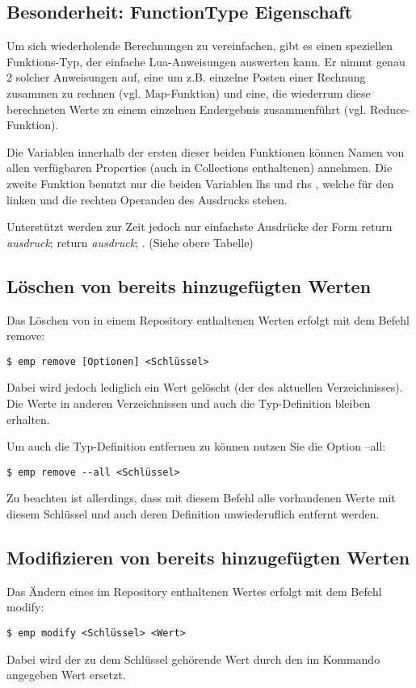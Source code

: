 \subsection{Besonderheit: FunctionType Eigenschaft}
Um sich wiederholende Berechnungen zu vereinfachen, gibt es einen speziellen Funktions-Typ, der einfache Lua-Anweisungen auswerten kann. Er nimmt genau 2 solcher Anweisungen auf, eine um z.B. einzelne Posten einer Rechnung zusammen zu rechnen (vgl. \grqq Map-Funktion\grqq) und eine, die wiederrum diese berechneten Werte zu einem einzelnen Endergebnis zusammenführt (vgl. \grqq Reduce-Funktion\grqq).

Die Variablen innerhalb der ersten dieser beiden Funktionen können Namen von allen verfügbaren Properties (auch in Collections enthaltenen) annehmen. Die zweite Funktion benutzt nur die beiden Variablen \grqq lhs \grqq und \grqq rhs \grqq , welche für den linken und die rechten Operanden des Ausdrucks stehen.

Unterstützt werden zur Zeit jedoch nur einfachste Ausdrücke der Form \grqq return \emph{ausdruck}; return \emph{ausdruck}; \grqq. (Siehe obere Tabelle)


\subsection{Löschen von bereits hinzugefügten Werten}
Das Löschen von in einem Repository enthaltenen Werten erfolgt mit dem Befehl remove:
\begin{lstlisting}[style=Bash]
$ emp remove [Optionen] <Schlüssel>
\end{lstlisting}

Dabei wird jedoch lediglich ein Wert gelöscht (der des aktuellen Verzeichnisses). Die Werte in anderen Verzeichnissen und auch die Typ-Definition bleiben erhalten.

Um auch die Typ-Definition entfernen zu können nutzen Sie die Option --all:
\begin{lstlisting}[style=Bash]
$ emp remove --all <Schlüssel>
\end{lstlisting}
Zu beachten ist allerdings, dass mit diesem Befehl alle vorhandenen Werte mit diesem Schlüssel und auch deren Definition unwiederuflich entfernt werden.

\subsection{Modifizieren von bereits hinzugefügten Werten}
Das Ändern eines im Repository enthaltenen Wertes erfolgt mit dem Befehl modify:
\begin{lstlisting}[style=Bash]
$ emp modify <Schlüssel> <Wert>
\end{lstlisting}
Dabei wird der zu dem Schlüssel gehörende Wert durch den im Kommando angegeben Wert ersetzt.


